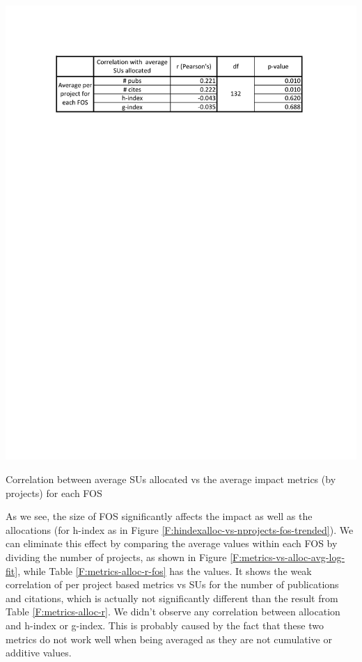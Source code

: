 \documentclass{sig-alternate}
\begin{document}
\begin{table}[!htb] 
  \centering 
    \includegraphics[width=1.0\columnwidth]{images/metrics_alloc_r_fos.pdf} 
  \caption{Correlation between average SUs allocated vs the average impact metrics (by projects) for each FOS}\label{F:metrics-alloc-r-fos} 
\end{table} 
 
As we see, the size of FOS significantly affects the impact as well as the allocations (for h-index as in Figure \ref{F:hindexalloc-vs-nprojects-fos-trended}). We can eliminate this effect by comparing the average values within each FOS by dividing the number of projects, as shown in Figure \ref{F:metrics-vs-alloc-avg-log-fit}, while Table \ref{F:metrics-alloc-r-fos} has the values. It shows the weak correlation of per project based metrics vs SUs for the number of publications and citations, which is actually not significantly different than the result from Table \ref{F:metrics-alloc-r}. We didn't observe any correlation between allocation and h-index or g-index. This is probably caused by the fact that these two metrics do not work well when being averaged as they are not cumulative or additive values. 
 
\end{document}
